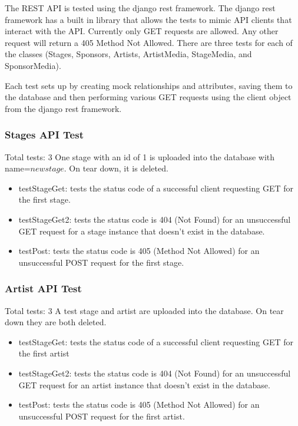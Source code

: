 \documentclass[12pt,english]{scrartcl}
\begin{document}
The REST API is tested using the django rest framework. The django rest framework has a built in library that allows the tests to mimic API clients that interact with the API.
Currently only GET requests are allowed. Any other request will return a 405 Method Not Allowed. There are three tests for each of the 
classes (Stages, Sponsors, Artists, ArtistMedia, StageMedia, and SponsorMedia). 

Each test sets up by creating mock relationships and attributes,
saving them to the database and then performing various GET requests using the client object from the django rest framework.

\subsubsection{Stages API Test} 
Total tests: 3
One stage with an id of 1 is uploaded into the database with name=$new stage$. On tear down, it is deleted.
\begin{itemize}
 \item testStageGet: tests the status code of a successful client requesting GET for the first stage.
 
 \item testStageGet2: tests the status code is 404 (Not Found) for an unsuccessful GET request for a stage instance
 that doesn't exist in the database.
 
 \item testPost: tests the status code is 405 (Method Not Allowed) for an unsuccessful POST request for the first stage.
\end{itemize}

\subsubsection{Artist API Test} 
Total tests: 3
A test stage and artist are uploaded into the database. On tear down they are both deleted.
\begin{itemize}
 \item testStageGet: tests the status code of a successful client requesting GET for the first artist
 
 \item testStageGet2: tests the status code is 404 (Not Found) for an unsuccessful GET request for an artist instance
 that doesn't exist in the database.
 
 \item testPost: tests the status code is 405 (Method Not Allowed) for an unsuccessful POST request for the first artist.
\end{itemize}
\end{document}
